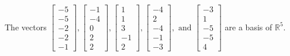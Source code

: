 \begin{exercise}
\begin{exerciseStatement}
  \end{exerciseStatement}
  \begin{exerciseAnswer}
   The vectors \(\left[\begin{array}{r}
-5 \\
-5 \\
-2 \\
-2 \\
-1
\end{array}\right] , \left[\begin{array}{r}
-1 \\
-4 \\
0 \\
2 \\
2
\end{array}\right] , \left[\begin{array}{r}
1 \\
1 \\
3 \\
-1 \\
2
\end{array}\right] , \left[\begin{array}{r}
-4 \\
2 \\
-4 \\
-1 \\
-3
\end{array}\right] , \text{ and } \left[\begin{array}{r}
-3 \\
1 \\
-5 \\
-5 \\
4
\end{array}\right]\) 
  	 are  a basis of \(\mathbb{R}^5\).
  


  \end{exerciseAnswer}
\end{exercise}